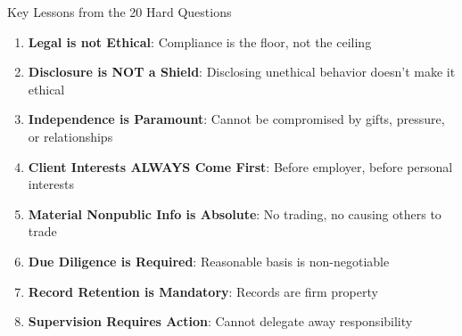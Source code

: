 \documentclass{beamer}
\begin{document}
	\begin{frame}{Key Lessons from the 20 Hard Questions}
		\begin{enumerate}
			\item \textbf{Legal is not Ethical}: Compliance is the floor, not the ceiling
			\item \textbf{Disclosure is NOT a Shield}: Disclosing unethical behavior doesn't make it ethical
			\item \textbf{Independence is Paramount}: Cannot be compromised by gifts, pressure, or relationships
			\item \textbf{Client Interests ALWAYS Come First}: Before employer, before personal interests
			\item \textbf{Material Nonpublic Info is Absolute}: No trading, no causing others to trade
			\item \textbf{Due Diligence is Required}: Reasonable basis is non-negotiable
			\item \textbf{Record Retention is Mandatory}: Records are firm property
			\item \textbf{Supervision Requires Action}: Cannot delegate away responsibility
		\end{enumerate}
	\end{frame}
	
\end{document}
